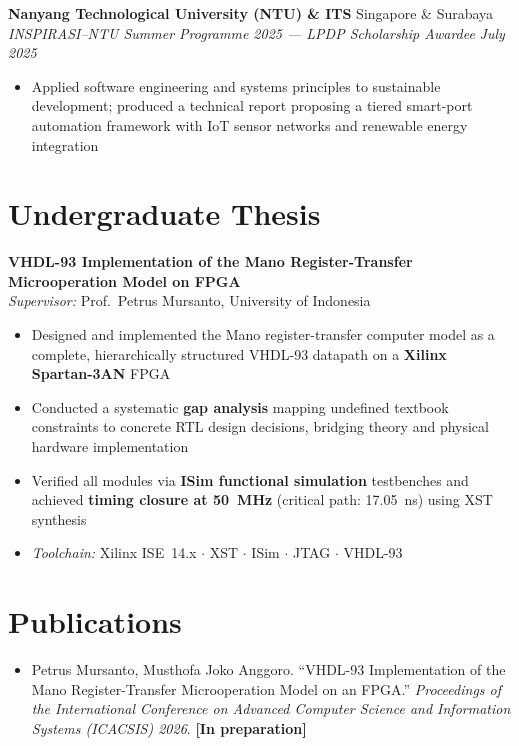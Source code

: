 \documentclass[11pt,a4paper]{article}
\newcommand{\entryheader}[4]{%
    {\small\textbf{#1}} \hfill {\small #2} \\
    {\small\textit{#3}} \hfill {\small\textit{#4}}%
}
\begin{document}
\vspace{3pt}
\entryheader{Nanyang Technological University (NTU) \& ITS}{Singapore \& Surabaya}{INSPIRASI--NTU Summer Programme 2025 --- LPDP Scholarship Awardee}{July 2025}
\begin{itemize}[leftmargin=1.5em, itemsep=1pt, topsep=2pt]
    \item Applied software engineering and systems principles to sustainable development; produced a technical report proposing a tiered smart-port automation framework with IoT sensor networks and renewable energy integration
\end{itemize}

\section*{Undergraduate Thesis}

{\small\textbf{VHDL-93 Implementation of the Mano Register-Transfer Microoperation Model on FPGA}} \\[1pt]
{\small\textit{Supervisor:} Prof.\ Petrus Mursanto, University of Indonesia}
\begin{itemize}[leftmargin=1.5em, itemsep=1pt, topsep=2pt]
    \item Designed and implemented the Mano register-transfer computer model as a complete, hierarchically structured VHDL-93 datapath on a \textbf{Xilinx Spartan-3AN} FPGA
    \item Conducted a systematic \textbf{gap analysis} mapping undefined textbook constraints to concrete RTL design decisions, bridging theory and physical hardware implementation
    \item Verified all modules via \textbf{ISim functional simulation} testbenches and achieved \textbf{timing closure at 50~MHz} (critical path: 17.05~ns) using XST synthesis
    \item \textit{Toolchain:} Xilinx ISE~14.x $\cdot$ XST $\cdot$ ISim $\cdot$ JTAG $\cdot$ VHDL-93
\end{itemize}

\section*{Publications}

\begin{itemize}[leftmargin=1.5em, itemsep=2pt, topsep=2pt]
    \item Petrus Mursanto, Musthofa Joko Anggoro. ``VHDL-93 Implementation of the Mano Register-Transfer Microoperation Model on an FPGA.'' \textit{Proceedings of the International Conference on Advanced Computer Science and Information Systems (ICACSIS) 2026}. \textbf{[In preparation]}
\end{itemize}
\end{document}
